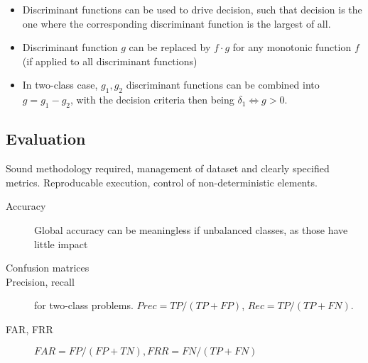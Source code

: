 \begin{itemize}
		\item Discriminant functions can be used to drive decision, such that
				decision is the one where the corresponding discriminant
				function is the largest of all.
		\item Discriminant function $g$ can be replaced by $f \cdot g$ for any
				monotonic function $f$ (if applied to all discriminant
				functions)
		\item In two-class case, $g_1, g_2$ discriminant functions can be
				combined into $g = g_1 - g_2$, with the decision criteria then
				being $\delta_1 \Leftrightarrow g > 0$.
\end{itemize}

\subsection{Evaluation}

Sound methodology required, management of dataset and clearly specified
metrics. Reproducable execution, control of non-deterministic elements.

\begin{description}
		\item[Accuracy] Global accuracy can be meaningless if unbalanced
				classes, as those have little impact
		\item[Confusion matrices]
		\item[Precision, recall] for two-class problems. $Prec = TP / (TP +
				FP)$, $Rec = TP / (TP + FN)$.
		\item[FAR, FRR] $FAR = FP / (FP + TN), FRR = FN / (TP + FN)$
\end{description}
